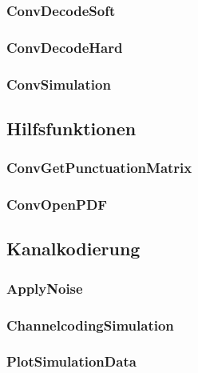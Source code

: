 \subsubsection{ConvDecodeSoft}


\subsubsection{ConvDecodeHard}


\subsubsection{ConvSimulation}


\subsection{Hilfsfunktionen}
\label{kapitel:interface_hilfsfunktionen}

\subsubsection{ConvGetPunctuationMatrix}


\subsubsection{ConvOpenPDF}


\subsection{Kanalkodierung}
\label{kapitel:interface_kanalkodierung}

\subsubsection{ApplyNoise}


\subsubsection{ChannelcodingSimulation}


\subsubsection{PlotSimulationData}
